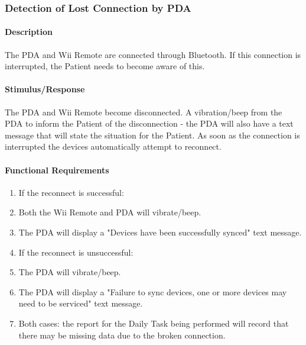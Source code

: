\documentclass{article}
\begin{document}
\subsubsection {Detection of Lost Connection by PDA}\label{sec: Wii Conn Lost}

\paragraph {Description}
The PDA and Wii Remote are connected through Bluetooth. If this connection is interrupted, the Patient needs to become aware of this.

\paragraph {Stimulus/Response}
The PDA and Wii Remote become disconnected. A vibration/beep from the PDA to inform the Patient of the disconnection - the PDA will also have a text message that will state the situation for the Patient. As soon as the connection is interrupted the devices automatically attempt to reconnect.
 
\paragraph {Functional Requirements}
\begin{enumerate}
\item If the reconnect is successful:
\item Both the Wii Remote and PDA will vibrate/beep.
\item The PDA will display a "Devices have been successfully synced" text message.
\item If the reconnect is unsuccessful:
\item The PDA will vibrate/beep. 
\item The PDA will display a "Failure to sync devices, one or more devices may need to be serviced" text message.
\item Both cases: the report for the Daily Task being performed will record that there may be missing data due to the broken connection.
\end{enumerate}
\end{document}
